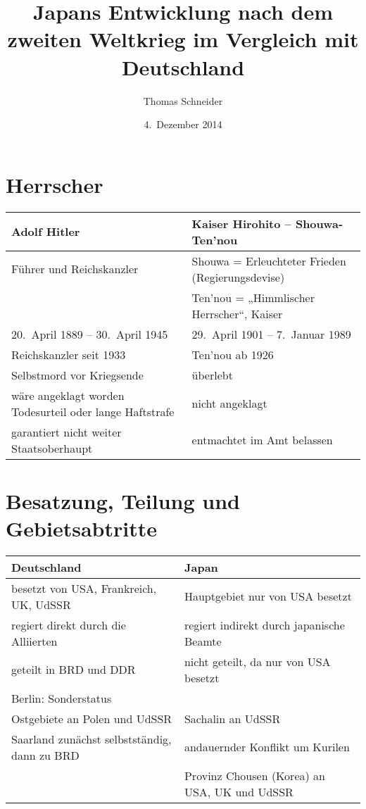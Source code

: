 \documentclass{scrartcl}
\title{Japans Entwicklung nach dem zweiten Weltkrieg im Vergleich mit
	Deutschland}
\author{Thomas Schneider}
\date{4.\ Dezember 2014}
\begin{document}
\maketitle

\section{Herrscher}
\begin{tabular}{p{} p{}}
Adolf Hitler & Kaiser Hirohito -- Shouwa-Ten’nou\\
\hline \hline
Führer und Reichskanzler & Shouwa = Erleuchteter Frieden (Regierungsdevise)\\
& Ten’nou = „Himmlischer Herrscher“, Kaiser\\
\hline
20.\  April 1889 -- 30.\ April 1945 & 29.\ April 1901 -- 7.\ Januar 1989\\
Reichskanzler seit 1933 & Ten’nou ab 1926\\
\hline
Selbstmord vor Kriegsende & überlebt\\
wäre angeklagt worden \newline Todesurteil oder lange Haftstrafe & nicht
angeklagt\\
garantiert nicht weiter Staatsoberhaupt & entmachtet im Amt belassen\\
\end{tabular}

\section{Besatzung, Teilung und Gebietsabtritte}
\begin{tabular}{p{} p{}}
Deutschland & Japan\\
\hline \hline
besetzt von USA, Frankreich, UK, UdSSR & Hauptgebiet nur von USA besetzt\\
regiert direkt durch die Alliierten & regiert indirekt durch japanische Beamte\\
\hline
geteilt in BRD und DDR & nicht geteilt, da nur von USA besetzt\\
Berlin: Sonderstatus &\\
\hline
Ostgebiete an Polen und UdSSR & Sachalin an UdSSR\\
Saarland zunächst selbstständig, dann zu BRD & andauernder Konflikt um Kurilen\\
& Provinz Chousen (Korea) an USA, UK und UdSSR\\
\end{tabular}
\end{document}
